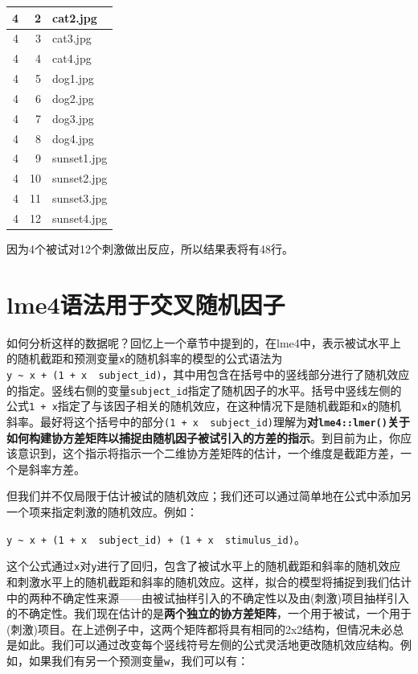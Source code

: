 \documentclass[
]{book}
\begin{document}
\begin{tabular}{r|r|l}
\hline
4 & 2 & cat2.jpg\\
\hline
4 & 3 & cat3.jpg\\
\hline
4 & 4 & cat4.jpg\\
\hline
4 & 5 & dog1.jpg\\
\hline
4 & 6 & dog2.jpg\\
\hline
4 & 7 & dog3.jpg\\
\hline
4 & 8 & dog4.jpg\\
\hline
4 & 9 & sunset1.jpg\\
\hline
4 & 10 & sunset2.jpg\\
\hline
4 & 11 & sunset3.jpg\\
\hline
4 & 12 & sunset4.jpg\\
\hline
\end{tabular}

因为4个被试对12个刺激做出反应，所以结果表将有48行。

\hypertarget{lme4ux8bedux6cd5ux7528ux4e8eux4ea4ux53c9ux968fux673aux56e0ux5b50}{%
\section{lme4语法用于交叉随机因子}\label{lme4ux8bedux6cd5ux7528ux4e8eux4ea4ux53c9ux968fux673aux56e0ux5b50}}

如何分析这样的数据呢？回忆上一个章节中提到的，在lme4中，表示被试水平上的随机截距和预测变量\texttt{x}的随机斜率的模型的公式语法为\texttt{y\ \textasciitilde{}\ x\ +\ (1\ +\ x\ \textbar{}\ subject\_id)}，其中用包含在括号中的竖线\texttt{\textbar{}}部分进行了随机效应的指定。竖线右侧的变量\texttt{subject\_id}指定了随机因子的水平。括号中竖线左侧的公式\texttt{1\ +\ x}指定了与该因子相关的随机效应，在这种情况下是随机截距和\texttt{x}的随机斜率。最好将这个括号中的部分\texttt{(1\ +\ x\ \textbar{}\ subject\_id)}理解为\textbf{对\texttt{lme4::lmer()}关于如何构建协方差矩阵以捕捉由随机因子被试引入的方差的指示}。到目前为止，你应该意识到，这个指示将指示一个二维协方差矩阵的估计，一个维度是截距方差，一个是斜率方差。

但我们并不仅局限于估计被试的随机效应；我们还可以通过简单地在公式中添加另一个项来指定刺激的随机效应。例如：

\texttt{y\ \textasciitilde{}\ x\ +\ (1\ +\ x\ \textbar{}\ subject\_id)\ +\ (1\ +\ x\ \textbar{}\ stimulus\_id)}。

这个公式通过\texttt{x}对\texttt{y}进行了回归，包含了被试水平上的随机截距和斜率的随机效应和刺激水平上的随机截距和斜率的随机效应。这样，拟合的模型将捕捉到我们估计中的两种不确定性来源------由被试抽样引入的不确定性以及由(刺激)项目抽样引入的不确定性。我们现在估计的是\textbf{两个独立的协方差矩阵}，一个用于被试，一个用于(刺激)项目。在上述例子中，这两个矩阵都将具有相同的2x2结构，但情况未必总是如此。我们可以通过改变每个竖线\texttt{\textbar{}}符号左侧的公式灵活地更改随机效应结构。例如，如果我们有另一个预测变量\texttt{w}，我们可以有：
\end{document}
